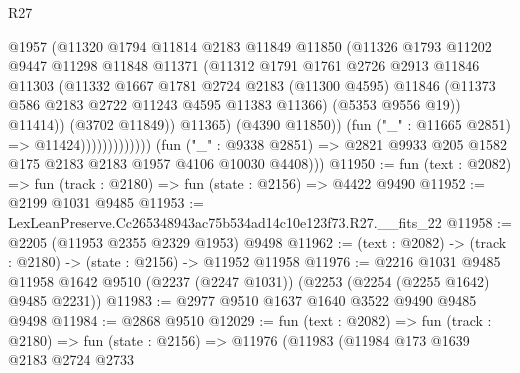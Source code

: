 \begin{lexlean}{R27}
\begin{coremodule}
                                    @1957
                                    (@11320
                                      @1794
                                      @11814
                                      @2183
                                      @11849
                                      @11850
                                      (@11326
                                        @1793
                                        @11202
                                        @9447
                                        @11298
                                        @11848
                                        @11371
                                        (@11312
                                          @1791
                                          @1761
                                          @2726
                                          @2913
                                          @11846
                                          @11303
                                          (@11332
                                            @1667
                                            @1781
                                            @2724
                                            @2183
                                            (@11300 @4595)
                                            @11846
                                            (@11373 @586 @2183 @2722 @11243 @4595 @11383 @11366)
                                            (@5353 @9556 @19))
                                          @11414))
                                      (@3702 @11849))
                                    @11365)
                                  (@4390 @11850))
                                (fun ("_" : @11665 @2851) => @11424)))))))))))))
        (fun ("_" : @9338 @2851) =>
        @2821 @9933 @205 @1582 @175 @2183 @2183 @1957 @4106 @10030 @4408)))
@11950 := fun (text : @2082) => fun (track : @2180) => fun (state : @2156) => @4422 @9490
@11952 := @2199 @1031 @9485
@11953 := LexLeanPreserve.Cc265348943ac75b534ad14c10e123f73.R27.__fits_22
@11958 := @2205 (@11953 @2355 @2329 @1953) @9498
@11962 := (text : @2082) -> (track : @2180) -> (state : @2156) -> @11952 @11958
@11976 := @2216
    @1031
    @9485
    @11958
    @1642
    @9510
    (@2237 (@2247 @1031))
    (@2253 (@2254 (@2255 @1642) @9485 @2231))
@11983 := @2977 @9510 @1637 @1640 @3522 @9490 @9485 @9498
@11984 := @2868 @9510
@12029 := fun (text : @2082) =>
  fun (track : @2180) =>
  fun (state : @2156) =>
  @11976
    (@11983
      (@11984
        @173
        @1639
        @2183
        @2724
        @2733

\end{coremodule}
\end{lexlean}
